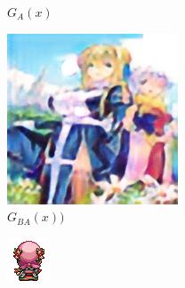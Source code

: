 \documentclass[twocolumn,11pt]{ctexart}
\begin{document}
\begin{figure}[htb]
\begin{subfigure}[b]{0.23\linewidth}
        \caption{$G_A(x)$}
      \end{subfigure}
      \begin{subfigure}[b]{0.23\linewidth}
        \includegraphics[width=\linewidth]{exp7_epoch061_rec_A.png}
        \caption{$G_{BA}(x))$}
      \end{subfigure}
      \begin{subfigure}[b]{0.23\linewidth}
        \includegraphics[width=\linewidth]{exp7_epoch061_idt_A.png}

\end{subfigure}
\end{figure}
\end{document}
